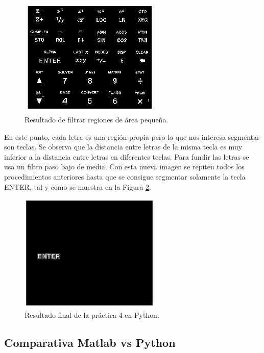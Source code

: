 \begin{figure}[h]
\centering
\includegraphics[width=0.6\textwidth]{imagenes/filtersmallareas}
\caption{Resultado de filtrar regiones de área pequeña.}
\label{filtersmallareas}
\end{figure}

En este punto, cada letra es una región propia pero lo que nos interesa segmentar son teclas. Se observa que la distancia entre letras de la misma tecla es muy inferior a la distancia entre letras en diferentes teclas. Para fundir las letras se usa un filtro paso bajo de media. Con esta nueva imagen se repiten todos los procedimientos anteriores hasta que se consigue segmentar solamente la tecla ENTER, tal y como se muestra en la  Figura \ref{finp4}.

\begin{figure}[h]
\centering
\includegraphics[width=0.6\textwidth]{imagenes/finp4}
\caption{Resultado final de la práctica 4 en Python.}
\label{finp4}
\end{figure}


\subsection{Comparativa Matlab vs Python}

